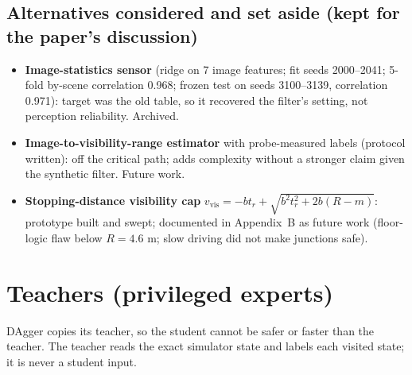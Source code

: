 \documentclass[11pt,a4paper]{article}
\begin{document}
\subsection{Alternatives considered and set aside (kept for the paper's discussion)}
\begin{itemize}[leftmargin=*]
\item \textbf{Image-statistics sensor} (ridge on 7 image features; fit seeds 2000--2041; 5-fold by-scene correlation 0.968; frozen test on seeds 3100--3139, correlation 0.971): target was the old table, so it recovered the filter's setting, not perception reliability. Archived.
\item \textbf{Image-to-visibility-range estimator} with probe-measured labels (protocol written): off the critical path; adds complexity without a stronger claim given the synthetic filter. Future work.
\item \textbf{Stopping-distance visibility cap} $v_{\text{vis}}=-bt_r+\sqrt{b^2t_r^2+2b(R-m)}$: prototype built and swept; documented in Appendix~B as future work (floor-logic flaw below $R=4.6$ m; slow driving did not make junctions safe).
\end{itemize}

\section{Teachers (privileged experts)}\label{sec:teachers}
DAgger copies its teacher, so the student cannot be safer or faster than the teacher. The teacher reads the exact simulator state and labels each visited state; it is never a student input.
\end{document}
